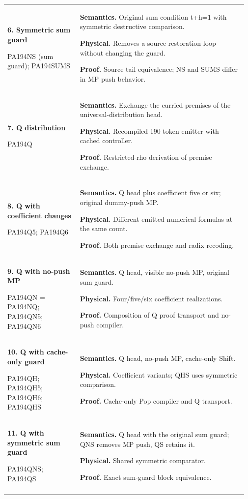 \begin{longtable}{@{}>{\raggedright\arraybackslash}p{0.295\linewidth}>{\raggedright\arraybackslash}p{0.675\linewidth}@{}}
\textbf{6. Symmetric sum guard}\par PA194NS (sum guard); PA194SUMS & \textbf{Semantics.} Original sum condition t+h=1 with symmetric destructive comparison.\par\textbf{Physical.} Removes a source restoration loop without changing the guard.\par\textbf{Proof.} Source tail equivalence; NS and SUMS differ in MP push behavior.\\\addlinespace[6pt]
\textbf{7. Q distribution}\par PA194Q & \textbf{Semantics.} Exchange the curried premises of the universal-distribution head.\par\textbf{Physical.} Recompiled 190-token emitter with cached controller.\par\textbf{Proof.} Restricted-rho derivation of premise exchange.\\\addlinespace[6pt]
\textbf{8. Q with coefficient changes}\par PA194Q5; PA194Q6 & \textbf{Semantics.} Q head plus coefficient five or six; original dummy-push MP.\par\textbf{Physical.} Different emitted numerical formulas at the same count.\par\textbf{Proof.} Both premise exchange and radix recoding.\\\addlinespace[6pt]
\textbf{9. Q with no-push MP}\par PA194QN = PA194NQ; PA194QN5; PA194QN6 & \textbf{Semantics.} Q head, visible no-push MP, original sum guard.\par\textbf{Physical.} Four/five/six coefficient realizations.\par\textbf{Proof.} Composition of Q proof transport and no-push compiler.\\\addlinespace[6pt]
\textbf{10. Q with cache-only guard}\par PA194QH; PA194QH5; PA194QH6; PA194QHS & \textbf{Semantics.} Q head, no-push MP, cache-only Shift.\par\textbf{Physical.} Coefficient variants; QHS uses symmetric comparison.\par\textbf{Proof.} Cache-only Pop compiler and Q transport.\\\addlinespace[6pt]
\textbf{11. Q with symmetric sum guard}\par PA194QNS; PA194QS & \textbf{Semantics.} Q head with the original sum guard; QNS removes MP push, QS retains it.\par\textbf{Physical.} Shared symmetric comparator.\par\textbf{Proof.} Exact sum-guard block equivalence.\\\addlinespace[6pt]

\end{longtable}

